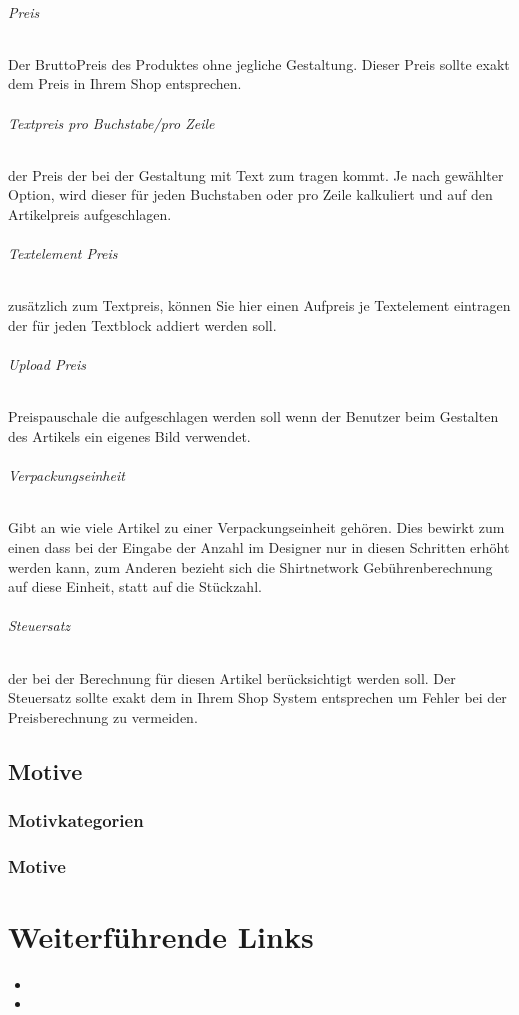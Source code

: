 \documentclass[letterpaper,10pt,ngerman]{sphinxmanual}
\begin{document}
\subparagraph{Preis}
\label{\detokenize{hbe/products/fields/prices:preis}}
Der Brutto\sphinxhyphen{}Preis des Produktes ohne jegliche
Gestaltung. Dieser Preis sollte exakt dem Preis in Ihrem Shop
entsprechen.


\subparagraph{Textpreis pro Buchstabe/pro Zeile}
\label{\detokenize{hbe/products/fields/prices:textpreis-pro-buchstabe-pro-zeile}}
der Preis der bei der Gestaltung mit Text zum tragen kommt. Je nach gewählter
Option, wird dieser für jeden Buchstaben oder pro Zeile
kalkuliert und auf den Artikelpreis aufgeschlagen.


\subparagraph{Textelement Preis}
\label{\detokenize{hbe/products/fields/prices:textelement-preis}}
zusätzlich zum Textpreis, können Sie hier
einen Aufpreis je Textelement eintragen der für jeden
Textblock addiert werden soll.


\subparagraph{Upload Preis}
\label{\detokenize{hbe/products/fields/prices:upload-preis}}
Preispauschale die aufgeschlagen werden soll
wenn der Benutzer beim Gestalten des Artikels ein eigenes
Bild verwendet.


\subparagraph{Verpackungseinheit}
\label{\detokenize{hbe/products/fields/prices:verpackungseinheit}}
Gibt an wie viele Artikel zu einer
Verpackungseinheit gehören. Dies bewirkt zum einen dass
bei der Eingabe der Anzahl im Designer nur in diesen
Schritten erhöht werden kann, zum Anderen bezieht sich die
Shirtnetwork Gebührenberechnung auf diese Einheit, statt
auf die Stückzahl.


\subparagraph{Steuersatz}
\label{\detokenize{hbe/products/fields/prices:steuersatz}}
der bei der Berechnung für diesen Artikel
berücksichtigt werden soll. Der Steuersatz sollte exakt dem in
Ihrem Shop System entsprechen um Fehler bei der
Preisberechnung zu vermeiden.


\section{Motive}
\label{\detokenize{hbe/logos/index:motive}}\label{\detokenize{hbe/logos/index::doc}}

\subsection{Motivkategorien}
\label{\detokenize{hbe/logos/categories:motivkategorien}}\label{\detokenize{hbe/logos/categories::doc}}

\subsection{Motive}
\label{\detokenize{hbe/logos/logos:motive}}\label{\detokenize{hbe/logos/logos::doc}}

\chapter{Weiterführende Links}
\label{\detokenize{index:weiterfuhrende-links}}\begin{itemize}
\item {} 

\item {} 

\end{itemize}



\renewcommand{\indexname}{Stichwortverzeichnis}
\printindex
\end{document}
